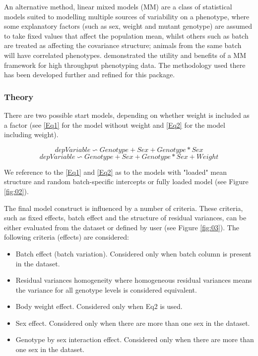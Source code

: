 \documentclass[12pt,a4paper]{article}
\begin{document}
An alternative method, linear mixed models (MM) are a class of statistical models suited to modelling multiple sources of variability on a phenotype, where some explanatory factors (such as sex, weight and mutant genotype) are assumed to take fixed values that affect the population mean, whilst others such as batch are treated as affecting the covariance structure; animals from the same batch will have correlated phenotypes. \cite{MM12} demonstrated the utility and benefits of a MM framework for high throughput phenotyping data. The methodology used there has been developed further and refined for this package. 

\subsubsection{Theory}
There are two possible start models, depending on whether weight is included as a factor (see \ref{Eq1} for the model without weight and \ref{Eq2} for the model including weight).

\[
depVariable \backsim Genotype + Sex +
Genotype*Sex \tag{Eq1}\label{Eq1}
\]
\[
depVariable \backsim Genotype + Sex +
Genotype*Sex + Weight \tag{Eq2}\label{Eq2}
\]

We reference to the \ref{Eq1} and \ref{Eq2} as to the models with "loaded" mean structure and random batch-specific intercepts or fully loaded model (see Figure \ref{fig:02}).

The final model construct is influenced by a number of criteria. 
These criteria, such as fixed effects, batch effect and the structure of residual variances, can be either evaluated from the dataset or defined by user (see Figure \ref{fig:03}).
The following criteria (effects) are considered:
\begin{itemize}
\item Batch effect (batch variation). Considered only when batch column is present in the dataset. 
\item Residual variances homogeneity where homogeneous residual variances means the variance for all genotype levels is considered equivalent.
\item Body weight effect. Considered only when Eq2 is used.
\item Sex effect. Considered only when there are more than one sex in the dataset. 
\item Genotype by sex interaction effect. Considered only when there are more than one sex in the dataset. 
\end{itemize}
\end{document}
